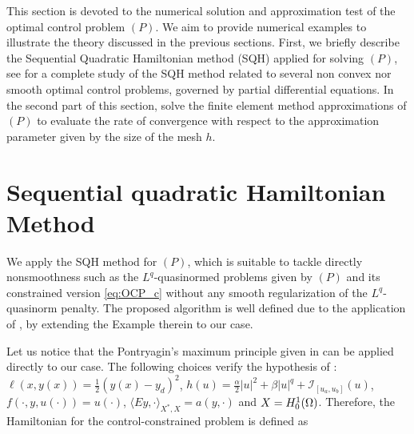 {This section is devoted to the numerical solution and approximation test of the optimal control problem $(P)$. We aim to provide numerical examples to illustrate the theory discussed in the previous sections. First, we briefly describe the Sequential Quadratic Hamiltonian method (SQH) applied for solving $(P)$, see \cite{borzi2023} for a complete study of the SQH method related to several non convex nor smooth optimal control problems, governed by partial differential equations. In the second part of this section, solve the finite element method approximations of $(P)$ to evaluate the rate of convergence with respect to the approximation parameter given by the size of the mesh $h$.

\section{Sequential quadratic Hamiltonian Method}\label{s:SQH}

We apply the SQH method for $(P)$, which is suitable to tackle directly nonsmoothness such as the ${L}^q$-quasinormed problems given by $(P)$ and its constrained version \eqref{eq:OCP_c} without any smooth regularization of the ${L}^q$-quasinorm penalty. The proposed algorithm is well defined due to the application of \cite[Theorem 7.4]{borzi2023}, by extending the Example therein to our case. 

Let us notice that the Pontryagin's maximum principle given  in \cite{ito-kunisch2014} can be applied directly to our case. The following choices verify the hypothesis of \cite[Theorem 2.2]{ito-kunisch2014}: $\ell(x,y(x))=\frac{1}{2}(y(x)-y_d)^2$, $h(u)=\frac{\alpha}{2}|u|^2+\beta|u|^q + \mathcal{I}_{[u_a,u_b]}(u) $, $f(\cdot,y,u(\cdot))=u(\cdot)$, $\langle Ey,\cdot\rangle_{X^*,X}=a(y,\cdot)$ and $X=H_0^1(\Omega)$. Therefore, the Hamiltonian for the control-constrained problem is defined as

}
